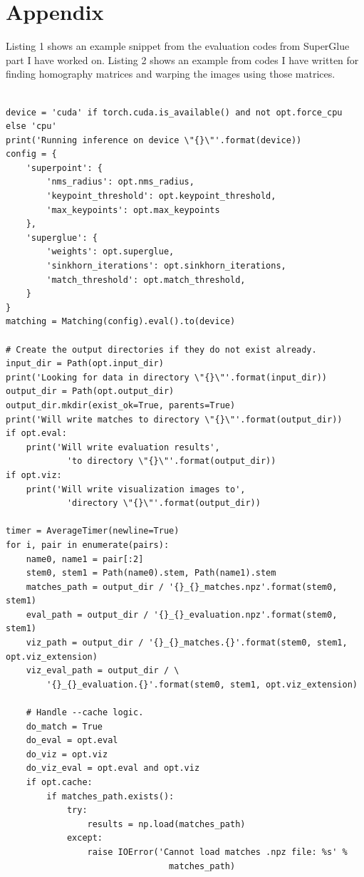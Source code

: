 \documentclass[letterpaper,12pt]{article}
\begin{document}



\section*{Appendix}
Listing 1 shows an example snippet from the evaluation codes from SuperGlue part I have worked on. Listing 2 shows an example from codes I have written for finding homography matrices and warping the images using those matrices. 
\begin{lstlisting}[caption={Sample Code Snippet for Evaluation},captionpos=b]

device = 'cuda' if torch.cuda.is_available() and not opt.force_cpu else 'cpu'
print('Running inference on device \"{}\"'.format(device))
config = {
    'superpoint': {
        'nms_radius': opt.nms_radius,
        'keypoint_threshold': opt.keypoint_threshold,
        'max_keypoints': opt.max_keypoints
    },
    'superglue': {
        'weights': opt.superglue,
        'sinkhorn_iterations': opt.sinkhorn_iterations,
        'match_threshold': opt.match_threshold,
    }
}
matching = Matching(config).eval().to(device)

# Create the output directories if they do not exist already.
input_dir = Path(opt.input_dir)
print('Looking for data in directory \"{}\"'.format(input_dir))
output_dir = Path(opt.output_dir)
output_dir.mkdir(exist_ok=True, parents=True)
print('Will write matches to directory \"{}\"'.format(output_dir))
if opt.eval:
    print('Will write evaluation results',
            'to directory \"{}\"'.format(output_dir))
if opt.viz:
    print('Will write visualization images to',
            'directory \"{}\"'.format(output_dir))

timer = AverageTimer(newline=True)
for i, pair in enumerate(pairs):
    name0, name1 = pair[:2]
    stem0, stem1 = Path(name0).stem, Path(name1).stem
    matches_path = output_dir / '{}_{}_matches.npz'.format(stem0, stem1)
    eval_path = output_dir / '{}_{}_evaluation.npz'.format(stem0, stem1)
    viz_path = output_dir / '{}_{}_matches.{}'.format(stem0, stem1, opt.viz_extension)
    viz_eval_path = output_dir / \
        '{}_{}_evaluation.{}'.format(stem0, stem1, opt.viz_extension)

    # Handle --cache logic.
    do_match = True
    do_eval = opt.eval
    do_viz = opt.viz
    do_viz_eval = opt.eval and opt.viz
    if opt.cache:
        if matches_path.exists():
            try:
                results = np.load(matches_path)
            except:
                raise IOError('Cannot load matches .npz file: %s' %
                                matches_path)


\end{lstlisting}
\end{document}
